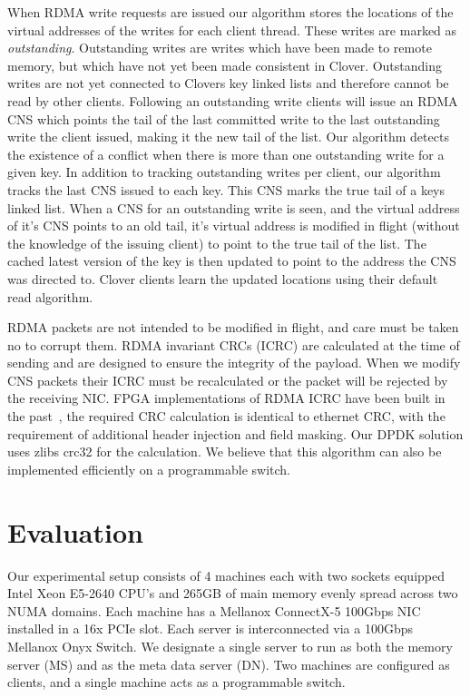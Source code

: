 When RDMA write requests are issued our algorithm stores the locations
of the virtual addresses of the writes for each client thread. These
writes are marked as \textit{outstanding}. Outstanding writes are
writes which have been made to remote memory, but which have not yet
been made consistent in Clover. Outstanding writes are not yet
connected to Clovers key linked lists and therefore cannot be read by
other clients. Following an outstanding write clients will issue an
RDMA CNS which points the tail of the last committed write to the last
outstanding write the client issued, making it the new tail of the
list. Our algorithm detects the existence of a conflict when there is
more than one outstanding write for a given key. In addition to
tracking outstanding writes per client, our algorithm tracks the last
CNS issued to each key. This CNS marks the true tail of a keys linked
list. When a CNS for an outstanding write is seen, and the virtual
address of it's CNS points to an old tail, it's virtual address is
modified in flight (without the knowledge of the issuing client) to
point to the true tail of the list. The cached latest version of the
key is then updated to point to the address the CNS was directed to.
Clover clients learn the updated locations using their default read
algorithm.

RDMA packets are not intended to be modified in flight, and care must
be taken no to corrupt them. RDMA invariant CRCs (ICRC) are calculated
at the time of sending and are designed to ensure the integrity of the
payload. When we modify CNS packets their ICRC must be recalculated or
the packet will be rejected by the receiving NIC. FPGA implementations
of RDMA ICRC have been built in the past~\cite{Mansour_2019}, the
required CRC calculation is identical to ethernet CRC, with the
requirement of additional header injection and field masking. Our DPDK
solution uses zlibs crc32 for the calculation. We believe that this
algorithm can also be implemented efficiently on a programmable
switch.

\section{Evaluation}

Our experimental setup consists of 4 machines each with two sockets
equipped Intel Xeon E5-2640 CPU's and 265GB of main memory evenly
spread across two NUMA domains. Each machine has a Mellanox ConnectX-5
100Gbps NIC installed in a 16x PCIe slot. Each server is
interconnected via a 100Gbps Mellanox Onyx Switch. We designate a
single server to run as both the memory server (MS) and as the meta
data server (DN). Two machines are configured as clients, and a single
machine acts as a programmable switch.

